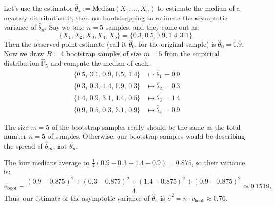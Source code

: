 Let's use the estimator
$\hat{\theta}_n := \mathrm{Median}(X_1, \dots, X_n)$
to estimate the median of a mystery distribution $\mathbb{P}$,
then use bootstrapping to estimate
the asymptotic variance of $\hat{\theta}_n$.
Say we take $n = 5$ samples, and they come out as:
\[ \{X_1, X_2, X_3, X_4, X_5\}
= \{0.3, 0.5, 0.9, 1.4, 3.1\}. \]
Then the observed point estimate (call it $\hat{\theta}_0$,
for the original sample) is $\hat{\theta}_0 = 0.9$.
Now we draw $B = 4$ bootstrap samples of size $m = 5$ from
the empirical distribution $\hat{\mathbb{P}}_5$
and compute the median of each.
\begin{align*}
    \{0.5,\, 3.1,\, 0.9,\, 0.5,\, 1.4\} &\mapsto \hat{\theta}_1 = 0.9 \\
    \{0.3,\, 0.3,\, 1.4,\, 0.9,\, 0.3\} &\mapsto \hat{\theta}_2 = 0.3 \\
    \{1.4,\, 0.9,\, 3.1,\, 1.4,\, 0.5\} &\mapsto \hat{\theta}_3 = 1.4 \\
    \{0.9,\, 0.5,\, 0.3,\, 3.1,\, 0.9\} &\mapsto \hat{\theta}_4 = 0.9
\end{align*}

\begin{remark}
    The size $m = 5$ of the bootstrap samples
    really should be the same as the total number $n = 5$ of samples.
    Otherwise, our bootstrap samples would be describing
    the spread of $\hat{\theta}_m$, not $\hat{\theta}_n$.
\end{remark}

The four medians average to
$\frac{1}{4}(0.9 + 0.3 + 1.4 + 0.9) = 0.875$, so
their variance is:
\[ v_{\mathrm{boot}} = \frac{(0.9 - 0.875)^2 + (0.3 - 0.875)^2
+ (1.4 - 0.875)^2 + (0.9 - 0.875)^2}{4} \approx 0.1519. \]
Thus, our estimate of the asymptotic variance of $\hat{\theta}_n$ is
$\hat{\sigma}^2 = n \cdot v_{\mathrm{boot}} \approx 0.76$.


